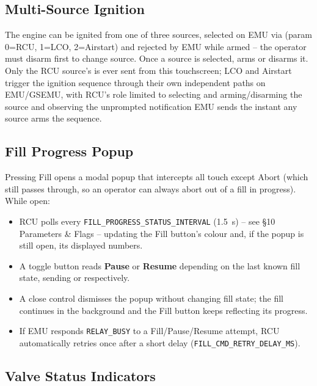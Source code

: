 ﻿\documentclass[11pt,letterpaper]{article}
\begin{document}
\subsection{Multi-Source Ignition}
\label{sec:multi-source-ignition}

The engine can be ignited from one of three sources, selected on EMU via
 (param 0=RCU, 1=LCO, 2=Airstart) and rejected by
EMU while armed -- the operator must disarm first to change source. Once a
source is selected,  arms or disarms it. Only the RCU
source's  is ever sent from this touchscreen; LCO and
Airstart trigger the ignition sequence through their own independent paths
on EMU/GSEMU, with RCU's role limited to selecting and arming/disarming
the source and observing the unprompted 
notification EMU sends the instant any source arms the sequence.

\subsection{Fill Progress Popup}
\label{sec:fill-popup}

Pressing Fill opens a modal popup that intercepts all touch except Abort
(which still passes through, so an operator can always abort out of a fill
in progress). While open:

\begin{itemize}[nosep]
  \item RCU polls  every
        \texttt{FILL\_PROGRESS\_STATUS\_INTERVAL} (1.5~s) -- see §10
        Parameters \& Flags -- updating the Fill button's colour and, if
        the popup is still open, its displayed numbers.
  \item A toggle button reads \textbf{Pause} or \textbf{Resume} depending
        on the last known fill state, sending  or
         respectively.
  \item A close control dismisses the popup without changing fill state;
        the fill continues in the background and the Fill button keeps
        reflecting its progress.
  \item If EMU responds \texttt{RELAY\_BUSY} to a Fill/Pause/Resume
        attempt, RCU automatically retries once after a short delay
        (\texttt{FILL\_CMD\_RETRY\_DELAY\_MS}).
\end{itemize}

\subsection{Valve Status Indicators}
\end{document}
